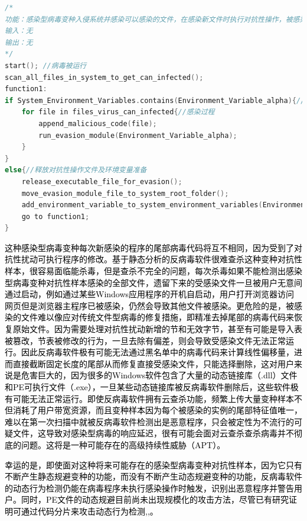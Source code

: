\begin{lstlisting}[language=C++, caption={code for attack}, label={lst:cppfile1}]
/*
功能：感染型病毒变种入侵系统并感染可以感染的文件，在感染新文件时执行对抗性操作，被感染的新文件会受到静态规避操作的修改。
输入：无
输出：无
*/
start(); //病毒被运行  
scan_all_files_in_system_to_get_can_infected();   
function1:  
if System_Environment_Variables.contains(Environment_Variable_alpha){//检测到环境变量  
    for file in files_virus_can_infected{//感染过程  
        append_malicious_code(file);  
        run_evasion_module(Environment_Variable_alpha);  
    }  
}  
else{//释放对抗性操作文件及环境变量准备  
    release_executable_file_for_evasion();  
    move_evasion_module_file_to_system_root_folder();  
    add_environment_variable_to_system_environment_variables(Environment_Variable_alpha);  
    go to function1;  
}  

\end{lstlisting}

\textcolor{black}{这种感染型病毒变种每次新感染的程序的尾部病毒代码将互不相同，因为受到了对抗性扰动可执行程序的修改。基于静态分析的反病毒软件很难查杀这种变种对抗性样本，很容易面临能杀毒，但是查杀不完全的问题，每次杀毒如果不能检测出感染型病毒变种对抗性样本感染的全部文件，遗留下来的受感染文件一旦被用户无意间通过启动，例如通过某些Windows应用程序的开机自启动，用户打开浏览器访问网页但是浏览器主程序已被感染，仍然会导致其他文件被感染。更危险的是，被感染的文件难以像应对传统文件型病毒的修复措施，即精准去掉尾部的病毒代码来恢复原始文件。因为需要处理对抗性扰动新增的节和无效字节，甚至有可能是导入表被篡改，节表被修改的行为，一旦去除有偏差，则会导致受感染文件无法正常运行。因此反病毒软件极有可能无法通过黑名单中的病毒代码来计算线性偏移量，进而直接截断固定长度的尾部从而修复直接受感染文件，只能选择删除，这对用户来说是危害巨大的，因为很多的Windows软件包含了大量的动态链接库（.dll）文件和PE可执行文件（.exe），一旦某些动态链接库被反病毒软件删除后，这些软件极有可能无法正常运行。即使反病毒软件拥有云查杀功能，频繁上传大量变种样本不但消耗了用户带宽资源，而且变种样本因为每个被感染的实例的尾部特征值唯一，难以在第一次扫描中就被反病毒软件检测出是恶意程序，只会被定性为不流行的可疑文件，这导致对感染型病毒的响应延迟，很有可能会面对云查杀查杀病毒并不彻底的问题。这将是一种可能存在的高级持续性威胁（APT）。}

\textcolor{black}{幸运的是，即使面对这种将来可能存在的感染型病毒变种对抗性样本，因为它只有不断产生静态规避变种的功能，而没有不断产生动态规避变种的功能，反病毒软件的动态行为检测仍能在病毒程序未执行感染操作时触发，识别出恶意程序并警告用户。同时，PE文件的动态规避目前尚未出现规模化的攻击方法，尽管已有研究证明可通过代码分片来攻击动态行为检测\parencite{ref38},\parencite{ref39},\parencite{ref40}。}

